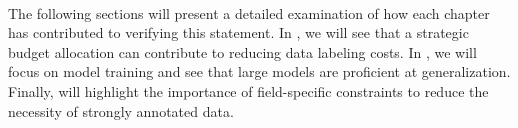 \textit{}
\\

The following sections will present a detailed examination of how each chapter has contributed to verifying this statement. In , we will see that a strategic budget allocation can contribute to reducing data labeling costs. In , we will focus on model training and see that large models are proficient at generalization. Finally,  will highlight the importance of field-specific constraints to reduce the necessity of strongly annotated data. %



